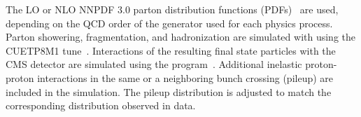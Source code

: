 The LO or NLO NNPDF 3.0 parton distribution functions (PDFs)~\cite{Ball:2014uwa} are 
used, depending on the QCD order of the generator used for each physics 
process. 
%
Parton showering, fragmentation, and hadronization are simulated with {\sc {}} using the CUETP8M1 tune~\cite{ue1,ue2}. 
%
Interactions of the resulting final state particles with the CMS detector are simulated using the \GEANTfour program~\cite{geant4}.
%
Additional inelastic proton-proton interactions in the same or a neighboring bunch crossing (pileup) are included in the simulation.
%
The pileup distribution is adjusted to match the corresponding distribution observed in data. 
